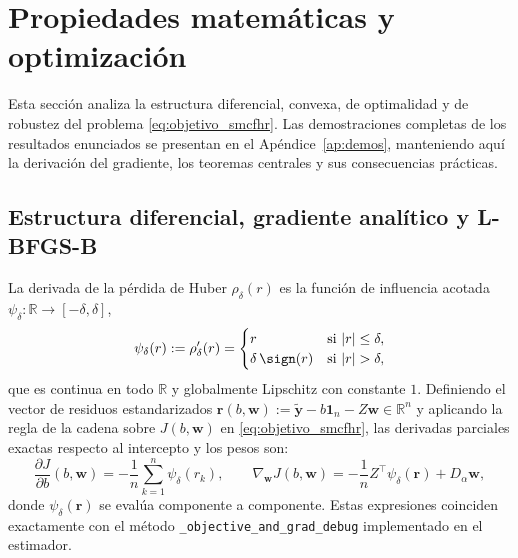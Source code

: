 \section{Propiedades matemáticas y optimización}\label{sec:propiedades}

Esta sección analiza la estructura diferencial, convexa, de optimalidad y de robustez del problema \eqref{eq:objetivo_smcfhr}. Las demostraciones completas de los resultados enunciados se presentan en el Apéndice~\ref{ap:demos}, manteniendo aquí la derivación del gradiente, los teoremas centrales y sus consecuencias prácticas.

\subsection{Estructura diferencial, gradiente analítico y L-BFGS-B}

La derivada de la pérdida de Huber $\rho_\delta(r)$ es la función de influencia acotada $\psi_\delta : \mathbb{R} \to [-\delta, \delta]$,
\begin{equation}
\psi_\delta(r) := \rho_\delta'(r) = \begin{cases}
r & \text{si } |r| \le \delta, \\
\delta\,\sign(r) & \text{si } |r| > \delta,
\end{cases}
\label{eq:psi_huber}
\end{equation}
que es continua en todo $\mathbb{R}$ y globalmente Lipschitz con constante $1$. Definiendo el vector de residuos estandarizados $\mathbf{r}(b, \mathbf{w}) := \tilde{\mathbf{y}} - b\mathbf{1}_n - Z\mathbf{w} \in \mathbb{R}^n$ y aplicando la regla de la cadena sobre $J(b,\mathbf{w})$ en \eqref{eq:objetivo_smcfhr}, las derivadas parciales exactas respecto al intercepto y los pesos son:
\begin{equation}
\frac{\partial J}{\partial b}(b,\mathbf{w}) = -\frac{1}{n}\sum_{k=1}^{n} \psi_\delta(r_k), \qquad
\nabla_{\mathbf{w}} J(b,\mathbf{w}) = -\frac{1}{n} Z^\top \psi_\delta(\mathbf{r}) + D_\alpha \mathbf{w},
\label{eq:gradiente_smcfhr}
\end{equation}
donde $\psi_\delta(\mathbf{r})$ se evalúa componente a componente. Estas expresiones coinciden exactamente con el método \texttt{\_objective\_and\_grad\_debug} implementado en el estimador.

